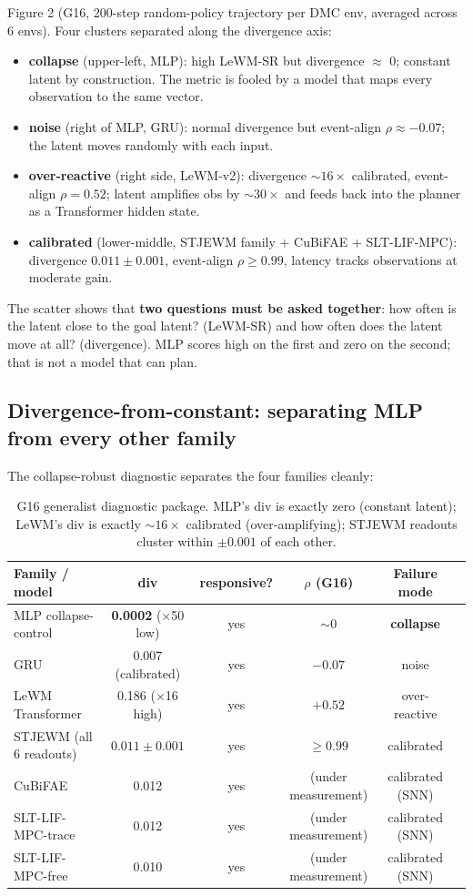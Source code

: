 \documentclass{article}
\begin{document}
Figure 2 (G16, 200-step random-policy trajectory per DMC env, averaged across 6 envs). Four clusters separated along the divergence axis:
\begin{itemize}
\item \textbf{collapse} (upper-left, MLP): high LeWM-SR but divergence $\approx$ 0; constant latent by construction. The metric is fooled by a model that maps every observation to the same vector.
\item \textbf{noise} (right of MLP, GRU): normal divergence but event-align $\rho \approx -0.07$; the latent moves randomly with each input.
\item \textbf{over-reactive} (right side, LeWM-v2): divergence $\sim 16\times$ calibrated, event-align $\rho = 0.52$; latent amplifies obs by $\sim 30\times$ and feeds back into the planner as a Transformer hidden state.
\item \textbf{calibrated} (lower-middle, STJEWM family + CuBiFAE + SLT-LIF-MPC): divergence $0.011 \pm 0.001$, event-align $\rho \geq 0.99$, latency tracks observations at moderate gain.
\end{itemize}

The scatter shows that \textbf{two questions must be asked together}: how often is the latent close to the goal latent? (LeWM-SR) and how often does the latent move at all? (divergence). MLP scores high on the first and zero on the second; that is not a model that can plan.

\subsection{Divergence-from-constant: separating MLP from every other family}

The collapse-robust diagnostic separates the four families cleanly:

\begin{table}[ht]
\centering
\small
\begin{tabular}{lccccl}
\toprule
Family / model & div & responsive? & $\rho$ (G16) & Failure mode \\
\midrule
MLP collapse-control & \textbf{0.0002} ($\times$50 low) & yes & $\sim$0 & \textbf{collapse} \\
GRU & 0.007 (calibrated) & yes & $-0.07$ & noise \\
LeWM Transformer & 0.186 ($\times$16 high) & yes & $+0.52$ & over-reactive \\
STJEWM (all 6 readouts) & $0.011 \pm 0.001$ & yes & $\geq 0.99$ & calibrated \\
CuBiFAE & 0.012 & yes & (under measurement) & calibrated (SNN) \\
SLT-LIF-MPC-trace & 0.012 & yes & (under measurement) & calibrated (SNN) \\
SLT-LIF-MPC-free & 0.010 & yes & (under measurement) & calibrated (SNN) \\
\bottomrule
\end{tabular}
\caption{G16 generalist diagnostic package. MLP's div is exactly
zero (constant latent); LeWM's div is exactly $\sim 16 \times$
calibrated (over-amplifying); STJEWM readouts cluster within
$\pm 0.001$ of each other.}
\label{tab:g16-diagnostic}
\end{table}
\end{document}
